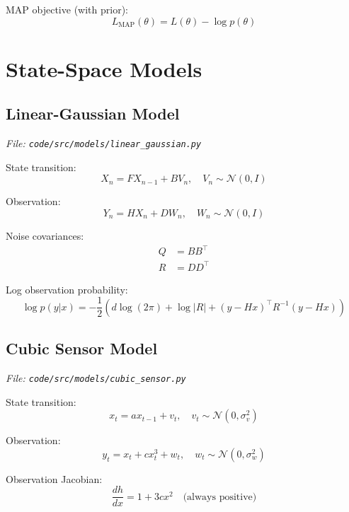 \documentclass[12pt]{article}
\begin{document}
MAP objective (with prior):
\begin{equation}
L_{\text{MAP}}(\theta) = L(\theta) - \log p(\theta)
\end{equation}

\section{State-Space Models}

\subsection{Linear-Gaussian Model}
\textit{File: \texttt{code/src/models/linear\_gaussian.py}}

State transition:
\begin{equation}
X_n = F X_{n-1} + B V_n, \quad V_n \sim \mathcal{N}(0, I)
\end{equation}

Observation:
\begin{equation}
Y_n = H X_n + D W_n, \quad W_n \sim \mathcal{N}(0, I)
\end{equation}

Noise covariances:
\begin{align}
Q &= BB^\top \\
R &= DD^\top
\end{align}

Log observation probability:
\begin{equation}
\log p(y|x) = -\frac{1}{2} \left( d \log(2\pi) + \log|R| + (y - Hx)^\top R^{-1} (y - Hx) \right)
\end{equation}

\subsection{Cubic Sensor Model}
\textit{File: \texttt{code/src/models/cubic\_sensor.py}}

State transition:
\begin{equation}
x_t = a x_{t-1} + v_t, \quad v_t \sim \mathcal{N}(0, \sigma_v^2)
\end{equation}

Observation:
\begin{equation}
y_t = x_t + c x_t^3 + w_t, \quad w_t \sim \mathcal{N}(0, \sigma_w^2)
\end{equation}

Observation Jacobian:
\begin{equation}
\frac{dh}{dx} = 1 + 3cx^2 \quad \text{(always positive)}
\end{equation}
\end{document}
